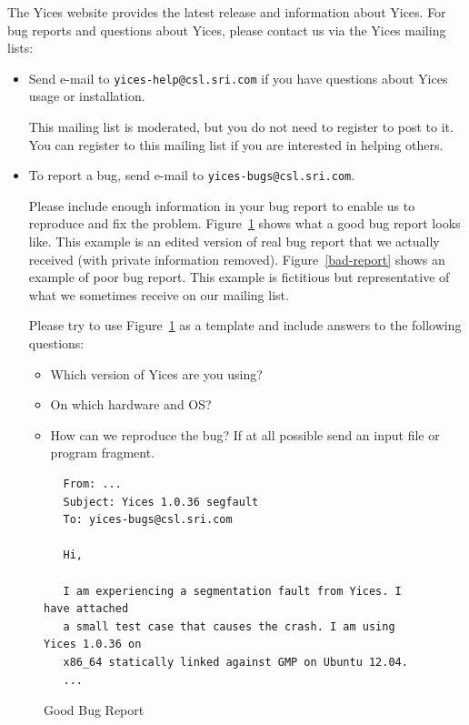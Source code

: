 \documentclass[11pt,twoside,fleqn,openright,titlepage]{cslreport}
\begin{document}
The Yices  website provides the  latest release and  information about
Yices.  For bug  reports and questions about Yices,  please contact us
via the Yices mailing lists:
\begin{itemize}
\item Send e-mail to \texttt{yices-help@csl.sri.com} if you have
  questions about Yices usage or installation.

  This mailing list is moderated, but you do not need to register to
  post to it. You can register to this mailing list if you are
  interested in helping others.

\item To report a bug, send e-mail to \texttt{yices-bugs@csl.sri.com}.

  Please include enough information in your bug report to enable us to
  reproduce and fix the problem. Figure~\ref{good-report} shows what a
  good bug report looks like. This example is an edited version of
  real bug report that we actually received (with private information
  removed). Figure~\ref{bad-report} shows an example of poor bug
  report. This example is fictitious but representative of what we
  sometimes receive on our mailing list.

  Please try to use Figure~\ref{good-report} as a template and include
  answers to the following questions:
    \begin{itemize}
    \item Which version of Yices are you using?
    \item On which hardware and OS?
    \item How can we reproduce the bug? If at all possible send an input file
      or program fragment.
    \end{itemize}
\end{itemize}

\begin{figure}
\begin{center}
\begin{footnotesize}
\begin{verbatim}
   From: ...
   Subject: Yices 1.0.36 segfault
   To: yices-bugs@csl.sri.com

   Hi,

   I am experiencing a segmentation fault from Yices. I have attached
   a small test case that causes the crash. I am using Yices 1.0.36 on
   x86_64 statically linked against GMP on Ubuntu 12.04.
   ...
\end{verbatim}
\end{footnotesize}
\end{center}
\caption{Good Bug Report}
\label{good-report}
\end{figure}
\end{document}
